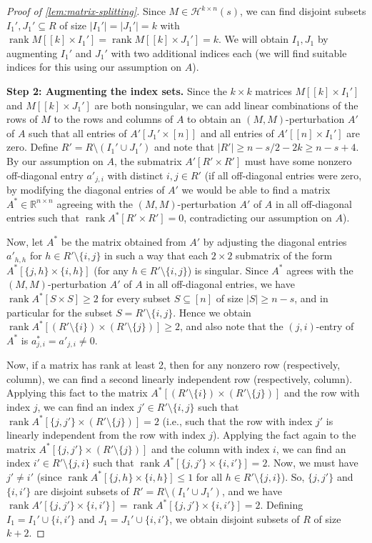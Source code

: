 \documentclass[english]{article}
\theoremstyle{remark}
\numberwithin{equation}{section}
\numberwithin{figure}{section}
\newcommand{\su}{\subseteq}
\newcommand{\RR}{\mathbb{R}}
\newcommand{\rank}{\operatorname{rank}}
\begin{document}
\begin{proof}[Proof of \cref{lem:matrix-splitting}]
Since $M\in\mathcal{H}^{k\times n}(s)$, we can find disjoint subsets $I_1',J_1'\su R$ of size $|I_1'|=|J_1'|=k$ with $\rank M[[k]\times I_1']=\rank M[[k]\times J_1']=k$. We will obtain $I_1,J_1$ by augmenting $I_1'$ and $J_1'$ with two additional indices each (we will find suitable indices for this using our assumption on $A$).

\textbf{Step 2: Augmenting the index sets.} Since the $k\times k$ matrices $M[[k]\times I_1']$ and $M[[k]\times J_1']$ are both nonsingular, we can add linear combinations of the rows of $M$ to the rows and columns of $A$ to obtain an $(M,M)$-perturbation $A'$ of $A$ such that all entries of $A'[J_1'\times [n]]$ and all entries of $A'[[n]\times I_1']$ are zero. Define  $R'=R\setminus (I_1'\cup J_1')$ and note that $|R'|\ge n-s/2-2k\ge n-s+4$. By our assumption on $A$, the submatrix $A'[R'\times R']$ must have some nonzero off-diagonal entry $a'_{j,i}$ with distinct $i,j\in R'$ (if all off-diagonal entries were zero, by modifying the diagonal entries of $A'$ we would be able to find a matrix $A^*\in \RR^{n\times n}$ agreeing with the $(M,M)$-perturbation $A'$ of $A$ in all off-diagonal entries such that $\rank A^*[R'\times R']=0$, contradicting our assumption on $A$).

Now, let $A^*$ be the matrix obtained from $A'$ by adjusting the diagonal entries $a'_{h,h}$ for $h\in R'\setminus \{i,j\}$ in such a way that each $2\times 2$ submatrix of the form $A^*[\{j,h\}\times \{i,h\}]$ (for any $h\in R'\setminus \{i,j\}$) is singular. Since $A^*$ agrees with the $(M,M)$-perturbation $A'$ of $A$ in all off-diagonal entries, we have $\rank A^*[S\times S]\ge 2$ for every subset $S\su [n]$ of size $|S|\ge n-s$, and in particular for the subset $S=R'\setminus \{i,j\}$. Hence we obtain $\rank A^*[(R'\setminus \{i\})\times  (R'\setminus \{j\})]\ge 2$, and also note that the $(j,i)$-entry of $A^*$ is $a^*_{j,i}=a'_{j,i}\ne 0$.

Now, if a matrix has rank at least 2, then for any nonzero row (respectively, column), we can find a second linearly independent row (respectively, column). Applying this fact to the matrix $A^*[(R'\setminus \{i\})\times  (R'\setminus \{j\})]$ and the row with index $j$, we can find an index $j'\in R'\setminus \{i,j\}$ such that $\rank A^*[\{j,j'\}\times  (R'\setminus \{j\})]=2$ (i.e., such that the row with index $j'$ is linearly independent from the row with index $j$). Applying the fact again to the matrix $A^*[\{j,j'\}\times  (R'\setminus \{j\})]$ and the column with index $i$, we can find an index $i'\in R'\setminus \{j,i\}$ such that $\rank A^*[\{j,j'\}\times  \{i,i'\}]=2$. Now, we must have $j'\ne i'$ (since $\rank A^*[\{j,h\}\times \{i,h\}]\le 1$ for all $h\in R'\setminus \{j,i\}$). So, $\{j,j'\}$ and $\{i,i'\}$ are disjoint subsets of $R'=R\setminus (I_1'\cup J_1')$, and we have $\rank A'[\{j,j'\}\times  \{i,i'\}]=\rank A^*[\{j,j'\}\times  \{i,i'\}]=2$. Defining $I_1=I_1'\cup \{i,i'\}$ and $J_1=J_1'\cup \{i,i'\}$, we obtain disjoint subsets of $R$ of size $k+2$.


\end{proof}
\end{document}
